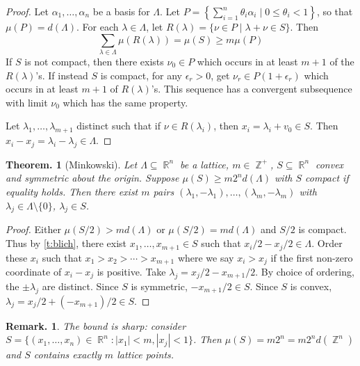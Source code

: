 \documentclass[11pt, a4paper]{memoir}
\DeclareMathOperator{\Z}{{\mathbb{Z}}}
\DeclareMathOperator{\R}{{\mathbb{R}}}
\theoremstyle{change}
\newtheorem{theorem}{Theorem.}[section]
\theoremstyle{plain}
\theoremstyle{nonumberplain}
\newtheorem{remark}{Remark.}
\newtheorem{proof}{Proof}
\numberwithin{equation}{section}
\begin{document}
\begin{proof}
    Let $\alpha_1,\ldots,\alpha_n$ be a basis for $\Lambda$.
    Let $P=\left\{\sum_{i=1}^n\theta_i\alpha_i\mid 0\leq\theta_i<1\right\}$, so that$\mu(P)=d(\Lambda)$.
    For each $\lambda\in\Lambda$, let $R(\lambda)=\{\nu\in P\mid\lambda+\nu\in S\}$.
    Then
    \begin{equation*}
        \sum_{\lambda\in\Lambda}\mu(R(\lambda))=\mu(S)\geq m\mu(P)
    \end{equation*}
    If $S$ is not compact, then there exists $\nu_0\in P$ which occurs in at least $m+1$ of the $R(\lambda)$'s.
    If instead $S$ is compact, for any $\epsilon_r>0$, get $\nu_r\in P(1+\epsilon_r)$ which occurs in at least $m+1$ of $R(\lambda)$'s.
    This sequence has a convergent subsequence with limit $\nu_0$ which has the same property.

    Let $\lambda_1,\ldots,\lambda_{m+1}$ distinct such that if $\nu\in R(\lambda_i)$, then $x_i=\lambda_i+v_0\in S$.
    Then $x_i-x_j=\lambda_i-\lambda_j\in\Lambda$.
\end{proof}
\begin{theorem}[Minkowski]\label{t:mink}
    Let $\Lambda\subseteq\R^n$ be a lattice, $m\in\Z^+$, $S\subseteq\R^n$ convex and symmetric about the origin.
    Suppose $\mu(S)\geq m2^nd(\Lambda)$ with $S$ compact if equality holds.
    Then there exist $m$ pairs $(\lambda_1,-\lambda_1),\ldots,(\lambda_m,-\lambda_m)$ with $\lambda_j\in\Lambda\setminus\{0\}$, $\lambda_j\in S$.
\end{theorem}
\begin{proof}
    Either $\mu(S/2)>md(\Lambda)$ or $\mu(S/2)=md(\Lambda)$ and $S/2$ is compact.
    Thus by \cref{t:blich}, there exist $x_1,\ldots,x_{m+1}\in S$ such that $x_i/2-x_j/2\in\Lambda$.
    Order these $x_i$ such that $x_1>x_2>\cdots>x_{m+1}$ where we say $x_i>x_j$ if the first non-zero coordinate of $x_i-x_j$ is positive.
    Take $\lambda_j=x_j/2-x_{m+1}/2$.
    By choice of ordering, the $\pm\lambda_j$ are distinct.
    Since $S$ is symmetric, $-x_{m+1}/2\in S$.
    Since $S$ is convex, $\lambda_j=x_j/2+(-x_{m+1})/2\in S$.
\end{proof}
\begin{remark}
    The bound is sharp: consider $S=\{(x_1,\ldots,x_n)\in\R^n:|x_1|<m,|x_j|<1\}$.
    Then $\mu(S)=m2^n=m2^nd(\Z^n)$ and $S$ contains exactly $m$ lattice points.
\end{remark}
\end{document}

